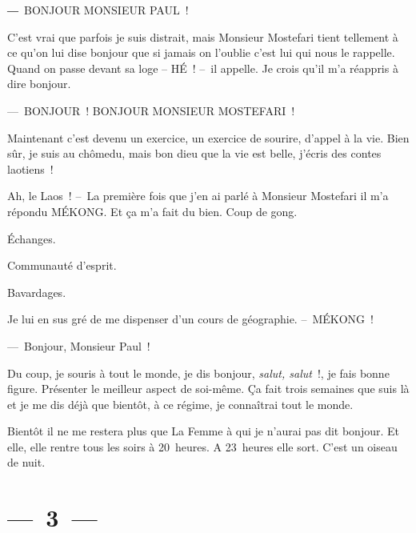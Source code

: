 \documentclass[french,twoside]{book} %
\begin{document}
― BONJOUR MONSIEUR PAUL !\par
C’est vrai que parfois je suis distrait, mais Monsieur Mostefari tient tellement à ce qu’on lui dise bonjour que si jamais on l’oublie c’est lui qui nous le rappelle. Quand on passe devant sa loge – HÉ ! – il appelle. Je crois qu’il m’a réappris à dire bonjour.\par
— BONJOUR ! BONJOUR MONSIEUR MOSTEFARI !\par
Maintenant c’est devenu un exercice, un exercice de sourire, d’appel à la vie. Bien sûr, je suis au chômedu, mais bon dieu que la vie est belle, j’écris des contes laotiens !\par
Ah, le Laos ! – La première fois que j’en ai parlé à Monsieur Mostefari il m’a répondu MÉKONG. Et ça m’a fait du bien. Coup de gong.\par
Échanges.\par
Communauté d’esprit.\par
Bavardages.\par
Je lui en sus gré de me dispenser d’un cours de géographie. – MÉKONG !\par
— Bonjour, Monsieur Paul !\par
Du coup, je souris à tout le monde, je dis bonjour, \emph{salut, salut} !, je fais bonne figure. Présenter le meilleur aspect de soi-même. Ça fait trois semaines que suis là et je me dis déjà que bientôt, à ce régime, je connaîtrai tout le monde.\par
Bientôt il ne me restera plus que La Femme à qui je n’aurai pas dit bonjour. Et elle, elle rentre tous les soirs à 20 heures. A 23 heures elle sort. C’est un oiseau de nuit.

\section[{— 3 —}]{— 3 —}
\renewcommand{\leftmark}{— 3 —}
\end{document}
